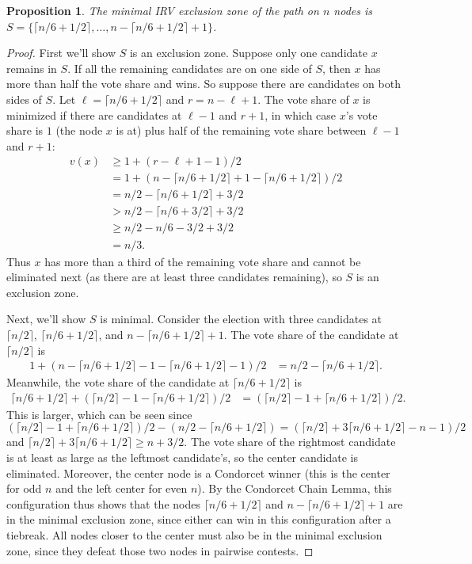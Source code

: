 \documentclass{article}
\theoremstyle{theorem}
\newtheorem{proposition}{Proposition}
\theoremstyle{definition}
\begin{document}
\begin{proposition}
  
The minimal IRV exclusion zone of the path on $n$ nodes is $S = \{ \lceil n/6 + 1/2 \rceil, \dots,  n - \lceil n/6 + 1/2 \rceil + 1 \}$.
\end{proposition}
\begin{proof}
First we'll show $S$ is an exclusion zone. Suppose only one candidate $x$ remains in $S$. If all the remaining candidates are on one side of $S$, then $x$ has more than half the vote share and wins. So suppose there are candidates on both sides of $S$. Let $\ell = \lceil n/6 + 1/2 \rceil$ and $r = n - \ell + 1$. The vote share of $x$ is minimized if there are candidates at $\ell-1$ and $r+1$, in which case $x$'s vote share is $1$ (the node $x$ is at) plus half of the remaining vote share between $\ell-1$ and $r+1$:
\begin{align*}
  v(x) &\ge 1 + (r - \ell +1 - 1 ) / 2\\
  &= 1 + \left(n - \lceil n/6 + 1/2 \rceil + 1  - \lceil n/6 + 1/2 \rceil  \right)/2\\
  &=  n/2 - \lceil n/6 + 1/2 \rceil + 3/2\\
  &>  n/2 - \lceil n/6 + 3/2 \rceil + 3/2\\
  &\ge  n/2 -  n/6 - 3/2 + 3/2\\
  &= n/3.
\end{align*}
Thus $x$ has more than a third of the remaining vote share and cannot be eliminated next (as there are at least three candidates remaining), so $S$ is an exclusion zone. 

Next, we'll show $S$ is minimal.  Consider the election with three candidates at $\lceil n/2 \rceil$, $\lceil n/6 + 1/2 \rceil$, and $n - \lceil n/6 + 1/2 \rceil + 1$. The vote share of the candidate at $\lceil n / 2 \rceil$ is
\begin{align*}
  1 + \left(n - \lceil n/6 + 1/2 \rceil - 1 - \lceil n/6 + 1/2 \rceil  - 1\right) /2 &= n/2 - \lceil n/6 + 1/2 \rceil.
\end{align*}
Meanwhile, the vote share of the candidate at $\lceil n/6 + 1/2 \rceil$ is
\begin{align*}
  \lceil n/6 + 1/2 \rceil + (\lceil n/2 \rceil - 1 - \lceil n/6 + 1/2 \rceil) / 2 &= (\lceil n/2 \rceil - 1 + \lceil n/6 + 1/2 \rceil) / 2.
\end{align*}
This is larger, which can be seen since $(\lceil n/2 \rceil - 1 + \lceil n/6 + 1/2 \rceil) / 2 - (n/2 - \lceil n/6 + 1/2 \rceil) = (\lceil n/2 \rceil + 3\lceil n/6 + 1/2 \rceil - n - 1) / 2$ and $\lceil n/2 \rceil + 3\lceil n/6 + 1/2 \rceil \ge n + 3/2$. The vote share of the rightmost candidate is at least as large as the leftmost candidate's, so the center candidate is eliminated. Moreover, the center node is a Condorcet winner (this is the center for odd $n$ and the left center for even $n$). By the Condorcet Chain Lemma, this configuration thus shows that the nodes $\lceil n/6 + 1/2 \rceil$ and $n - \lceil n/6 + 1/2 \rceil + 1 $ are in the minimal exclusion zone, since either can win in this configuration after a tiebreak. All nodes closer to the center must also be in the minimal exclusion zone, since they defeat those two nodes in pairwise contests. 
\end{proof}
\end{document}
